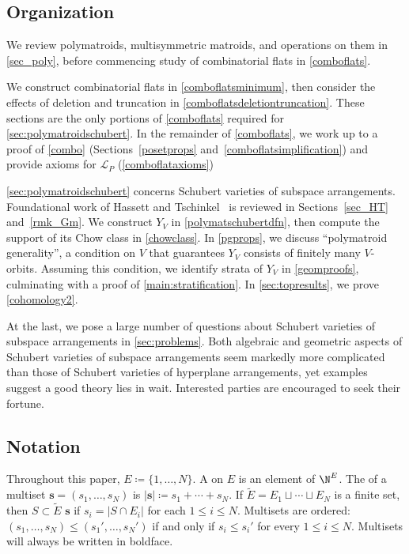 \subsection{Organization}
We review polymatroids, multisymmetric matroids, and operations on them in \cref{sec_poly}, before commencing study of combinatorial flats in \cref{comboflats}.

We construct combinatorial flats in \cref{comboflatsminimum}, then consider the effects of deletion and truncation in \cref{comboflatsdeletiontruncation}. These sections are the only portions of \cref{comboflats} required for \cref{sec:polymatroidschubert}.
In the remainder of \cref{comboflats},  we work up to a proof of \cref{combo} (Sections~\ref{posetprops} and~\ref{comboflatsimplification}) and provide axioms for $\mathcal L_P$ (\cref{comboflataxioms})

\cref{sec:polymatroidschubert} concerns Schubert varieties of subspace arrangements.
Foundational work of Hassett and Tschinkel~\cite{HT99} is reviewed in Sections~\ref{sec_HT} and~\ref{rmk_Gm}.
We construct $Y_V$ in \cref{polymatschubertdfn}, then compute the support of its Chow class in \cref{chowclass}.
In \cref{pgprops}, we discuss ``polymatroid generality'', a condition on $V$ that guarantees $Y_V$ consists of finitely many $V$-orbits.
Assuming this condition, we identify strata of $Y_V$ in \cref{geomproofs}, culminating with a proof of \cref{main:stratification}.
In \cref{sec:topresults}, we prove \cref{cohomology2}.

At the last, we pose a large number of questions about Schubert varieties of subspace arrangements in \cref{sec:problems}.
Both algebraic and geometric aspects of Schubert varieties of subspace arrangements seem markedly more complicated than those of Schubert varieties of hyperplane arrangements, yet examples suggest a good theory lies in wait.
Interested parties are encouraged to seek their fortune.

\subsection{Notation}\label{sec:notation}
Throughout this paper, $E \coloneqq \{1, \ldots, N\}$.
A  on $E$ is an element of $\N^E$.
The  of a multiset $\mathbf s = (s_1, \ldots, s_N)$ is $|\mathbf s| \coloneqq s_1 + \cdots + s_N$.
If $\widetilde E = E_1 \sqcup \cdots \sqcup E_N$ is a finite set, then  $S \subset \widetilde E$   $\mathbf s$ if $s_i = |S \cap E_i|$ for each $1 \leq i \leq N$.
Multisets are ordered: $(s_1, \ldots, s_N) \leq (s_1', \ldots, s_N')$  if and only if $s_i \leq s_i'$ for every $1 \leq i\leq N$.
Multisets will always be written in boldface.

